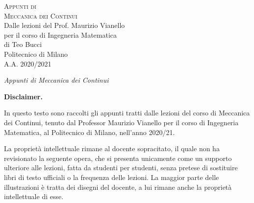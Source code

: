 \documentclass[10pt,a4paper,twoside]{book}
\begin{document}

\frontmatter %

\pagestyle{empty} %
\vspace*{\fill}
\begin{center}
	{\large \textsc{Appunti di}}\\
	\vspace*{0.4cm}
	{\Huge \textsc{Meccanica dei Continui}}\\
	\vspace*{1cm}
	{\large {Dalle lezioni del Prof. Maurizio Vianello}}\\
	\vspace*{0.1cm}
	{\large per il corso di Ingegneria Matematica}\\
	\vspace*{0.4cm}
	{\large {di Teo Bucci}}\\
	\vspace*{1cm}
	Politecnico di Milano\\
	A.A. 2020/2021
\end{center}
\vspace*{\fill}
\newpage


{\Large \textit{Appunti di Meccanica dei Continui}}

\vspace*{\fill}

\textbf{Disclaimer.}

In questo testo sono raccolti gli appunti tratti dalle lezioni del corso di Meccanica dei Continui, tenuto dal Professor Maurizio Vianello per il corso di Ingegneria Matematica, al Politecnico di Milano, nell'anno 2020/21.

La proprietà intellettuale rimane al docente sopracitato, il quale non ha revisionato la seguente opera, che si presenta unicamente come un supporto ulteriore alle lezioni, fatta da studenti per studenti, senza pretese di sostituire libri di testo ufficiali o la frequenza delle lezioni. La maggior parte delle illustrazioni è tratta dei disegni del docente, a lui rimane anche la proprietà intellettuale di esse.

\end{document}
